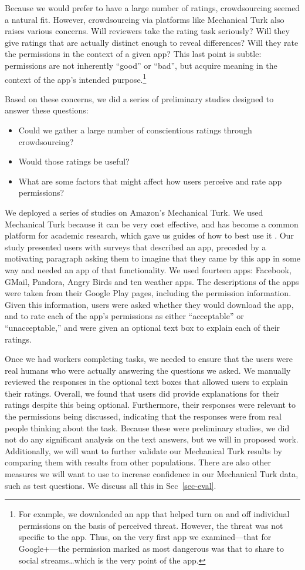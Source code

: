 \documentclass[11pt]{article}
\begin{document}
Because we would prefer to have a large number of ratings,
crowdsourcing seemed a natural fit. However, crowdsourcing via
platforms like Mechanical Turk also raises various concerns. Will
reviewers take the rating task seriously? Will they give ratings that
are actually distinct enough to reveal differences? Will they rate the
permissions in the context of a given app? This last point is subtle: permissions are
not inherently ``good'' or ``bad'', but acquire meaning in the context
of the app's intended purpose.\footnote{For example, we
  downloaded an app that helped turn on and off individual permissions
  on the basis of perceived threat. However, the threat was not
  specific to the app. Thus, on the very first app we examined---that
  for Google+---the permission marked as most dangerous was that to
  share to social streams\dots which is the very point of the app.}

Based on these concerns, we did a series of preliminary studies designed to answer
these questions:
\begin{itemize}
\item Could we gather a large number of conscientious ratings through crowdsourcing?
\item Would those ratings be useful?
\item What are some factors that might affect how users perceive and rate 
app permissions?
\end{itemize}
We deployed a series of studies on Amazon's Mechanical Turk. We used
Mechanical Turk because it can be very cost effective, and has become
a common platform for academic research, which gave us guides of how
to best use it \cite{reseach-mturk-BRM12, mturk-data-quality-PPS11}. 
Our study presented users with surveys that
described an app, preceded by a motivating paragraph asking
them to imagine that they came by this app in some way and needed an
app of that functionality.  We used fourteen apps: Facebook, GMail,
Pandora, Angry Birds and ten weather apps.  The descriptions
of the apps were taken from their Google Play pages, including the
permission information. Given this information, users were asked
whether they would download the app, and to rate each of the app's
permissions as either ``acceptable'' or ``unacceptable,'' and were
given an optional text box to explain each of their ratings.

Once we had workers completing tasks, we needed to ensure that the
users were real humans who were actually answering the questions we
asked. We manually reviewed the responses in the optional text boxes
that allowed users to explain their ratings. Overall, we found that
users did provide explanations for their ratings despite this being
optional. Furthermore, their responses were relevant to the
permissions being discussed, indicating that the responses were from
real people thinking about the task. Because these were preliminary
studies, we did not do any significant analysis on the text answers,
but we will in proposed work. Additionally, we will want to further
validate our Mechanical Turk results by comparing them with results
from other populations. There are also other measures we will want to
use to increase confidence in our Mechanical Turk data, such as test
questions.  We discuss all this in Sec~\ref{sec-eval}.
\end{document}
